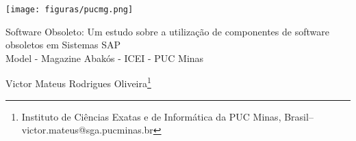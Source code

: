 \documentclass[a4paper,12pt,Times]{article}
\makeatletter
\newcommand{\monog}{Software Obsoleto: Um estudo sobre a utilização de componentes de software obsoletos em Sistemas SAP}
\newcommand{\monogES}{Model - Magazine Abakós - ICEI - PUC Minas}
\newcommand{\origem}{Brasil}
\newcommand{\AutorA}{Victor Mateus Rodrigues Oliveira}
\newcommand{\funcaoA}{}
\newcommand{\emailA}{victor.mateus@sga.pucminas.br}
\newcommand{\cursA}{Instituto de Ciências Exatas e de Informática da PUC Minas}
\newcommand{\keyword}[1]{\textsf{#1}}
\makeatother
\begin{document}

\begin{flushleft}

\begin{minipage} [c][5cm][b]{16.5cm} %
\texttt{[image: figuras/pucmg.png]} 
\end{minipage}

 \vspace{0cm} {
 \singlespacing \Large{\monog {} \\ }
  \normalsize{\monogES}
 }
\end{flushleft}
\begin{flushright}
\singlespacing 
\normalsize{\AutorA \footnote{\funcaoA \cursA, \origem -- \emailA }} \\
\end{flushright}
\thispagestyle{empty}

\begin{abstract}
\noindent
Este artigo aborda uma análise sobre a utilização de software em estado de obsolescência proveniente da multinacional alemã SAP, fundada em 1972 e atualmente gigante da área de tecnologia da informação. Apresenta conceitos de \textit{Software Obsolescence} e DMSMS assim como causas e efeitos da utilização de software obsoleto: Logística, Funcional, Tecnológica e FIDO. Conceitos e metodologias da gerência de obsolescência de software: Reativa, Proativa e Estratégica baseando-se principalmente na literatura de Peter Sandborn diretor da \textit{Maryland Technology Enterprise Institute}. Ao final é apresentado o resultado da pesquisa que levanta o cenário brasileiro de obsolescência em sistemas SAP e seus impactos. 
\\\textbf{\keyword{Palavras-chave: }} SAP, Obsolescência de Software, Gerência de Obsolescência, Software Obsoleto.

\end{abstract}
\end{document}
